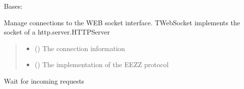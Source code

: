 \documentclass[letterpaper,10pt,english]{sphinxmanual}
\begin{document}
\begin{savenotes}\begin{fulllineitems}
\label{\detokenize{eezz:eezz.websocket.TWebSocket}}
\pysigstartsignatures
{}
\pysigstopsignatures
\sphinxAtStartPar
Bases: 

\sphinxAtStartPar
Manage connections to the WEB socket interface.
TWebSocket implements the socket of a http.server.HTTPServer
\begin{quote}\begin{description}
\begin{itemize}
\item {} 
\sphinxAtStartPar
{} (\sphinxstyleliteralemphasis{\sphinxupquote{{[}}}\sphinxstyleliteralemphasis{\sphinxupquote{, }}\sphinxstyleliteralemphasis{\sphinxupquote{{]}}}) \textendash{} The connection information

\item {} 
\sphinxAtStartPar
{} (\sphinxstyleliteralemphasis{\sphinxupquote{{[}}}{\hyperref[\detokenize{eezz:eezz.websocket.TWebSocketAgent}]{\sphinxcrossref{\sphinxstyleliteralemphasis{\sphinxupquote{TWebSocketAgent}}}}}\sphinxstyleliteralemphasis{\sphinxupquote{{]}}}) \textendash{} The implementation of the EEZZ protocol

\end{itemize}

\end{description}\end{quote}

\begin{savenotes}\begin{fulllineitems}
\label{\detokenize{eezz:eezz.websocket.TWebSocket.run}}
\pysigstartsignatures
{}
\pysigstopsignatures
\sphinxAtStartPar
Wait for incoming requests


\end{fulllineitems}
\end{savenotes}
\end{fulllineitems}
\end{savenotes}
\end{document}
